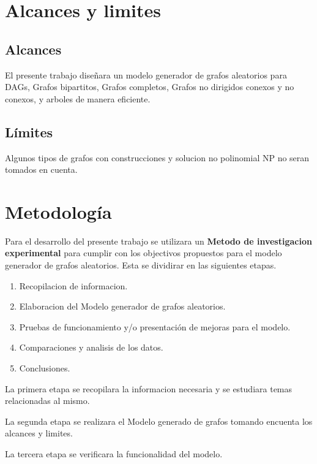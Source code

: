 \documentclass[11pt]{extarticle}
\begin{document}
\section{Alcances y limites}
  \subsection{Alcances}
    \begin{itemize}
      \guion El presente trabajo diseñara un modelo generador de grafos aleatorios
            para DAGs, Grafos bipartitos, Grafos completos, Grafos no dirigidos
            conexos y no conexos, y arboles de manera eficiente.
      \end{itemize}
  \subsection{L\'imites}
    \begin{itemize}
      \guion Algunos tipos de grafos con construcciones y solucion no polinomial NP no seran tomados en cuenta.
    \end{itemize}

\section{Metodolog\'ia}
  Para el desarrollo del presente trabajo se utilizara un 
  \textbf{Metodo de investigacion experimental} para cumplir con los 
    objectivos propuestos para el modelo generador de grafos aleatorios. 
    Esta se dividirar en las siguientes etapas.
    \begin{enumerate}
      \item Recopilacion de informacion.
      \item Elaboracion del Modelo generador de grafos aleatorios.
      \item Pruebas de funcionamiento y/o presentación de mejoras para el modelo.
      \item Comparaciones y analisis de los datos.
      \item Conclusiones.
    \end{enumerate}
    
    La primera etapa se recopilara la informacion necesaria y
    se estudiara temas relacionadas al mismo.\hfill\break

    La segunda etapa se realizara el Modelo generado de grafos tomando
    encuenta los alcances y limites. \hfill\break

    La tercera etapa se verificara la funcionalidad del modelo.
    \hfill\break
\end{document}
